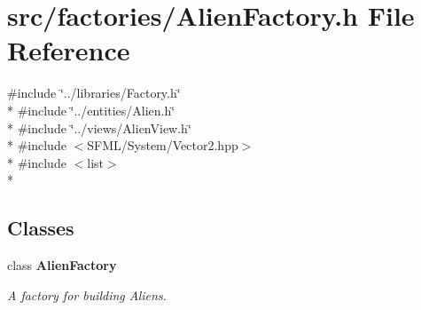 \section{src/factories/\-Alien\-Factory.h File Reference}
\label{_alien_factory_8h}
{\ttfamily \#include \char`\"{}../libraries/\-Factory.\-h\char`\"{}}\\*
{\ttfamily \#include \char`\"{}../entities/\-Alien.\-h\char`\"{}}\\*
{\ttfamily \#include \char`\"{}../views/\-Alien\-View.\-h\char`\"{}}\\*
{\ttfamily \#include $<$S\-F\-M\-L/\-System/\-Vector2.\-hpp$>$}\\*
{\ttfamily \#include $<$list$>$}\\*
\subsection*{Classes}
\begin{DoxyCompactItemize}
\item 
class {\bf Alien\-Factory}
\begin{DoxyCompactList}\small\item\em A factory for building Aliens. \end{DoxyCompactList}\end{DoxyCompactItemize}
